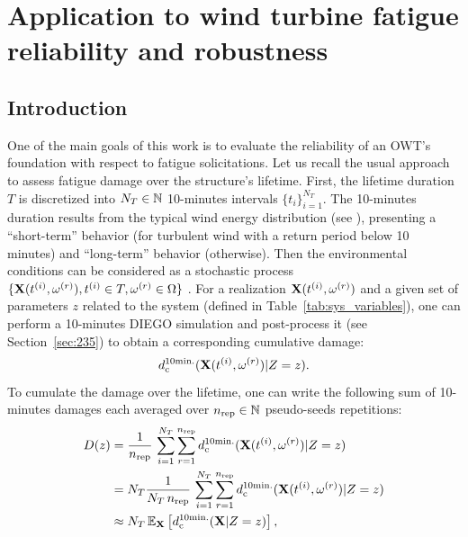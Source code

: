 \cleardoublepage
\chapter{Application to wind turbine fatigue reliability and robustness}
\label{chpt:7}
\hfill
\localtableofcontents
\newpage




\section{Introduction}
One of the main goals of this work is to evaluate the reliability of an OWT's foundation with respect to fatigue solicitations. 
Let us recall the usual approach to assess fatigue damage over the structure's lifetime. 
First, the lifetime duration $T$ is discretized into $N_T \in \mathbb{N}$ 10-minutes intervals $\{t_i\}_{i=1}^{N_T}$. 
The 10-minutes duration results from the typical wind energy distribution (see ), presenting a ``short-term'' behavior (for turbulent wind with a return period below 10 minutes) and ``long-term'' behavior (otherwise).
Then the environmental conditions can be considered as a stochastic process $\{{\bf X}(t^{(i)}, \omega^{(r)}), t^{(i)} \in T, \omega^{(r)} \in \Omega\}$ . 
For a realization ${\bf X}(t^{(i)}, \omega^{(r)})$ and a given set of parameters $z$ related to the system (defined in Table~\ref{tab:sys_variables}), one can perform a 10-minutes DIEGO simulation and post-process it (see Section~\ref{sec:235}) to obtain a corresponding cumulative damage:
\begin{equation}
    d_{\mathrm{c}}^{10\mathrm{min.}}({\bf X}(t^{(i)}, \omega^{(r)})|Z=z). 
\end{equation}
To cumulate the damage over the lifetime, one can write the following sum of 10-minutes damages each averaged over $n_{\mathrm{rep}} \in \mathbb{N}$ pseudo-seeds repetitions: 
\begin{subequations}
    \begin{align}
        D(z) &= \frac{1}{n_{\mathrm{rep}}} \, \sum_{i=1}^{N_T} \sum_{r=1}^{n_{\mathrm{rep}}} d_{\mathrm{c}}^{10\mathrm{min.}}({\bf X}(t^{(i)}, \omega^{(r)})|Z=z)\\
             &= N_T \frac{1}{N_T \, n_{\mathrm{rep}}} \, \sum_{i=1}^{N_T} \sum_{r=1}^{n_{\mathrm{rep}}} d_{\mathrm{c}}^{10\mathrm{min.}}({\bf X}(t^{(i)}, \omega^{(r)})|Z=z)\\
             &\approx N_T \, \mathbb{E}_{{\bf X}}\left[d_{\mathrm{c}}^{10\mathrm{min.}}({\bf X}|Z=z)\right],
             \label{eq:expected_damage}
    \end{align}
\end{subequations}
